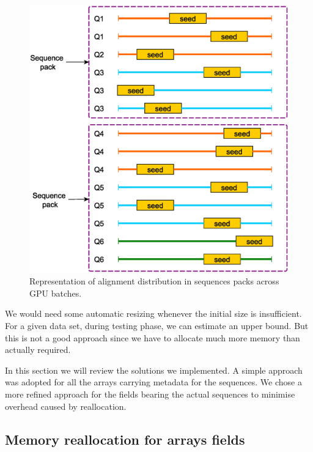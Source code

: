 \begin{figure}[h!]
	\centering
	\includegraphics[width=1\linewidth]{cpu-gpu-batches}
	\caption{Representation of alignment distribution in sequences packs across GPU batches.}
	\label{fig:cpu-gpu-batches}
\end{figure}


We would need some automatic resizing whenever the initial size is insufficient.
For a given data set, during testing phase, we can estimate an upper bound. But this is not a good approach since we have to allocate much more memory than actually required.

In this section we will review the solutions we implemented. A simple approach was adopted for all the arrays carrying metadata for the sequences. We chose a more refined approach for the fields bearing the actual sequences to minimise overhead caused by reallocation.

\subsection{Memory reallocation for arrays fields}

